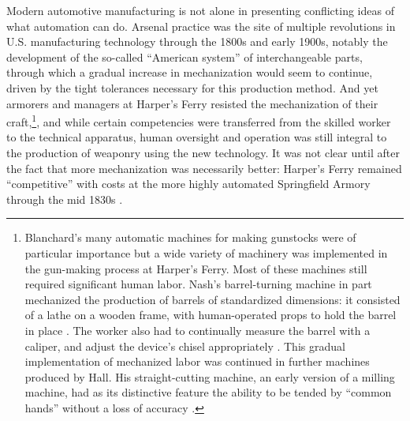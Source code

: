 Modern automotive manufacturing is not alone in presenting conflicting ideas
of what automation can do. Arsenal practice was the site of multiple
revolutions in U.S. 
manufacturing technology through the 1800s and early 1900s, notably
the development of the so-called ``American system'' of interchangeable
parts, through which a gradual increase in mechanization would seem to
continue, driven by the tight tolerances necessary for this production
method. And yet armorers and managers at Harper's Ferry resisted the
mechanization of their craft,\footnote{Blanchard's many automatic
  machines for making gunstocks were of particular
  importance \cite[p. 56]{roesmithHarpers} but a wide variety of machinery
  was implemented in the gun-making process at Harper's Ferry. Most of
 these machines still required significant human labor. Nash's
 barrel-turning machine in part mechanized the production of barrels
 of standardized dimensions: it consisted of a lathe on a wooden
 frame, with human-operated props to hold the barrel in
 place \cite[p. 119]{roesmithHarpers}. The worker also had to continually
 measure the barrel with a caliper, and adjust the device's chisel
 appropriately \cite[p. 121]{roesmithHarpers}. This gradual implementation of
 mechanized labor was continued in further machines produced by Hall.
 His straight-cutting machine, an early version of a milling machine,
 had as its distinctive feature the ability to be tended by ``common
 hands'' without a loss of
accuracy \cite[p. 239]{roesmithHarpers}.}, and while certain competencies were
transferred from the skilled worker
to the technical apparatus, human oversight and operation was still
integral to the production of weaponry using the new technology. It was
not clear until after the fact that more mechanization was necessarily
better: Harper's Ferry remained ``competitive'' with
costs at the more highly automated Springfield Armory through the mid
1830s \cite[p. 324]{roesmithHarpers}. 

